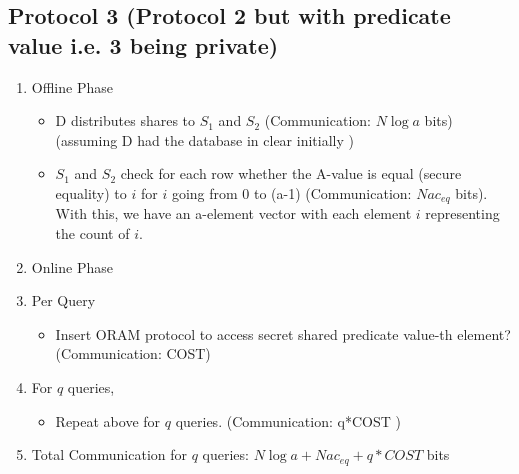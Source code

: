 \subsection{Protocol 3 (Protocol 2 but with predicate value i.e. 3 being private)}
\begin{enumerate}
    \item Offline Phase
    \begin{itemize}
        \item D distributes shares to $S_1$ and $S_2$ (Communication: $N\log a$ bits) (assuming D had the database in clear initially
)
        \item $S_1$ and $S_2$ check for each row whether the A-value is equal (secure equality) to $i$ for $i$ going from 0 to (a-1) (Communication: $Nac_{eq}$ bits). With this, we have an a-element vector with each element $i$ representing the count of $i$.
    \end{itemize}
    \item Online Phase
    \item Per Query
    \begin{itemize}
        \item Insert ORAM protocol to access secret shared predicate value-th element? (Communication: COST) 
    \end{itemize}
    \item For $q$ queries,
    \begin{itemize}
        \item Repeat above for $q$ queries. (Communication: q*COST )
    \end{itemize}
    \item Total Communication for $q$ queries: $N\log a + Nac_{eq} + q*COST$ bits  
\end{enumerate}

